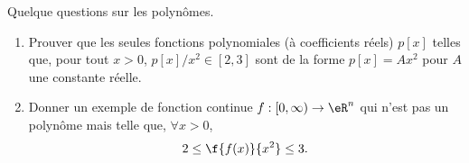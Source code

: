 
\begin{exercice}\label{exo0033}

Quelque questions sur les polynômes.
\begin{enumerate}
\item Prouver que les seules fonctions polynomiales (à coefficients réels) $p[x]$ telles que, pour tout $x>0$, $p[x]/ x^2\in[2,3]$ sont de la forme $p[x] = Ax^2$ pour $A$ une constante réelle.
\item Donner un exemple de fonction continue $f:[0,\infty)\rightarrow \eR^n$ qui n'est pas un polynôme mais telle que, $\forall x>0$,
\[
	2\leq\f{f(x)}{x^2}\leq3.
\] 
\end{enumerate}

\end{exercice}
